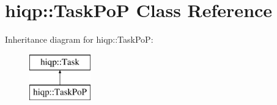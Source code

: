 \hypertarget{classhiqp_1_1TaskPoP}{\section{hiqp\-:\-:Task\-Po\-P Class Reference}
\label{classhiqp_1_1TaskPoP}
}
Inheritance diagram for hiqp\-:\-:Task\-Po\-P\-:\begin{figure}[H]
\begin{center}
\leavevmode
\includegraphics[height=2.000000cm]{classhiqp_1_1TaskPoP}
\end{center}
\end{figure}
